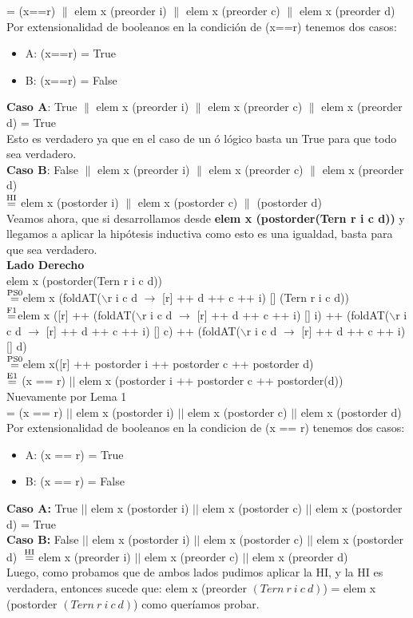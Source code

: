 \documentclass{article}
\begin{document}
= (x==r) $\|$ elem x (preorder i) $\|$ elem x (preorder c) $\|$ elem x (preorder d) \\
Por extensionalidad de booleanos en la condición de (x==r) tenemos dos casos:
\begin{itemize}
\item A: (x==r) = True 
\item B: (x==r) = False
\end{itemize}
\textbf{Caso A}: True $\|$ elem x (preorder i) $\|$ elem x (preorder c) $\|$ elem x (preorder d) = True \\
Esto es verdadero ya que en el caso de un ó lógico basta un True para que todo sea verdadero.  \\  
\textbf{Caso B}: False $\|$ elem x (preorder i) $\|$ elem x (preorder c) $\|$ elem x (preorder d) \\ 
$\stackrel{\text{HI}}{=}$ elem x (postorder i) $\|$ elem x (postorder c) $\|$ (postorder d) \\

Veamos ahora, que si desarrollamos desde \textbf{elem x (postorder(Tern r i c d))} y llegamos a aplicar la hipótesis inductiva como esto es una igualdad, basta para que sea verdadero. \\

\textbf{Lado Derecho} \\
elem x (postorder(Tern r i c d)) \\
$\stackrel{\text{PS0}}{=}$elem x (foldAT($\backslash$r i c d $\rightarrow$ [r] ++ d ++ c ++ i) [] (Tern r i c d))    \\
$\stackrel{\text{F1}}{=}$elem x ([r] ++ (foldAT($\backslash$r i c d $\rightarrow$ [r] ++ d ++ c ++ i) [] i) ++ (foldAT($\backslash$r i c d $\rightarrow$ [r] ++ d ++ c ++ i) [] c) ++ (foldAT($\backslash$r i c d $\rightarrow$ [r] ++ d ++ c ++ i) [] d) \\
$\stackrel{\text{PS0}}{=}$elem x([r] ++ postorder i ++ postorder c ++ postorder d) \\
$\stackrel{\text{E1}}{=}$ (x == r) $||$ elem x (postorder i ++ postorder c ++ postorder(d)) \\
Nuevamente por Lema 1 \\
= (x == r) $||$ elem x (postorder i) $||$ elem x (postorder c) $||$ elem x (postorder d)\\
Por extensionalidad de booleanos en la condicion de (x == r) tenemos dos casos:
\begin{itemize}
    \item A: (x == r) = True
    \item B: (x == r) = False
\end{itemize}
\textbf{Caso A:} True $||$ elem x (postorder i) $||$ elem x (postorder c) $||$ elem x (postorder d) = True \\
\textbf{Caso B:} False $||$ elem x (postorder i) $||$ elem x (postorder c) $||$ elem x (postorder d) $\\ \stackrel{\text{HI}}{=} $  elem x (preorder i) $||$ elem x (preorder c) $||$ elem x (preorder d) \\
Luego, como probamos que de ambos lados pudimos aplicar la HI, y la HI es verdadera, entonces sucede que: elem x (preorder $(Tern \ r \ i \ c \ d)$) = elem x (postorder $(Tern \ r \ i \ c \ d)$) como queríamos probar.
\end{document}
